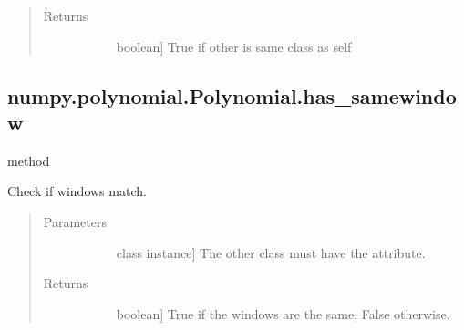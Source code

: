 \documentclass[letterpaper,10pt,english]{sphinxmanual}
\begin{document}
\begin{fulllineitems}
\begin{fulllineitems}
\begin{quote}
\begin{description}
\begin{description}
\end{description}

\item[{Returns}] \leavevmode\begin{description}
\item[{}] \leavevmode{[}boolean{]}
True if other is same class as self

\end{description}

\end{description}\end{quote}

\end{fulllineitems}



\subsection{numpy.polynomial.Polynomial.has\_samewindow}
\label{\detokenize{generated/generated/numpy.polynomial.Polynomial.has_samewindow:numpy-polynomial-polynomial-has-samewindow}}\label{\detokenize{generated/generated/numpy.polynomial.Polynomial.has_samewindow::doc}}
method

\begin{fulllineitems}
\label{\detokenize{generated/generated/numpy.polynomial.Polynomial.has_samewindow:numpy.polynomial.Polynomial.has_samewindow}}
Check if windows match.

\begin{quote}\begin{description}
\item[{Parameters}] \leavevmode\begin{description}
\item[{}] \leavevmode{[}class instance{]}
The other class must have the  attribute.

\end{description}

\item[{Returns}] \leavevmode\begin{description}
\item[{}] \leavevmode{[}boolean{]}
True if the windows are the same, False otherwise.


\end{description}
\end{description}
\end{quote}
\end{fulllineitems}
\end{fulllineitems}
\end{document}
